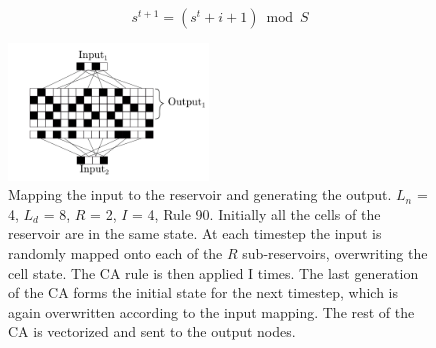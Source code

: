 \documentclass{elsarticle}
\begin{document}
\begin{multicols}{2}
              \begin{equation} \label{eq:input}
              s^{t+1} = (s^t + i + 1) \bmod S
              \end{equation}    


	      \begin{figure}[H]
        \centering
            \includegraphics[width=0.475\textwidth]{Architecture.pdf}
    \caption{Mapping the input to the reservoir and generating the output.  
        $L_{n}$ = 4, $L_{d}$ = 8, $R$ = 2, $I$ = 4, Rule 90. Initially all the 
            cells of the reservoir are in the same state. At each timestep the 
            input is randomly mapped onto each of the $R$ sub-reservoirs, 
                  overwriting the cell state. The CA rule is then applied I 
                      times. The last generation of the CA forms the initial 
                      state for the next timestep, which is again overwritten 
                      according to the input mapping. The rest of the CA is 
                      vectorized and sent to the output nodes. } 
        
            \label{architecture}
            \end{figure}


\end{multicols}
\end{document}
